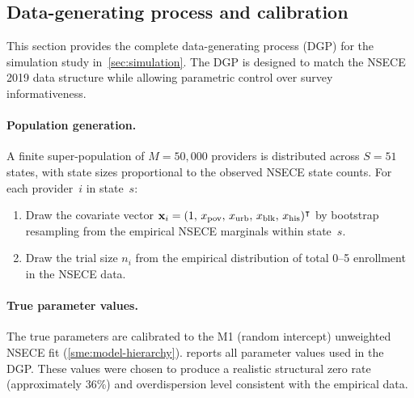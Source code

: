 
\subsection{Data-generating process and calibration}
\label{smf:dgp}

This section provides the complete data-generating process (DGP)
for the simulation study in~\cref{sec:simulation}.
The DGP is designed to match the NSECE 2019 data structure while
allowing parametric control over survey informativeness.

\paragraph{Population generation.}
A finite super-population of $M = 50{,}000$ providers is distributed
across $S = 51$ states, with state sizes proportional to the
observed NSECE state counts.  For each provider~$i$ in state~$s$:
\begin{enumerate}
  \item Draw the covariate vector
    $\mathbf{x}_i = (1,\, x_{\mathrm{pov}},\, x_{\mathrm{urb}},\,
    x_{\mathrm{blk}},\, x_{\mathrm{his}})^\intercal$ by bootstrap
    resampling from the empirical NSECE marginals within state~$s$.
  \item Draw the trial size $n_i$ from the empirical distribution
    of total 0--5 enrollment in the NSECE data.
\end{enumerate}

\paragraph{True parameter values.}
The true parameters are calibrated to the M1 (random intercept)
unweighted NSECE fit (\cref{sme:model-hierarchy}).
 reports all parameter values used in the
DGP.  These values were chosen to produce a realistic structural
zero rate (approximately 36\%) and overdispersion level
consistent with the empirical data.


